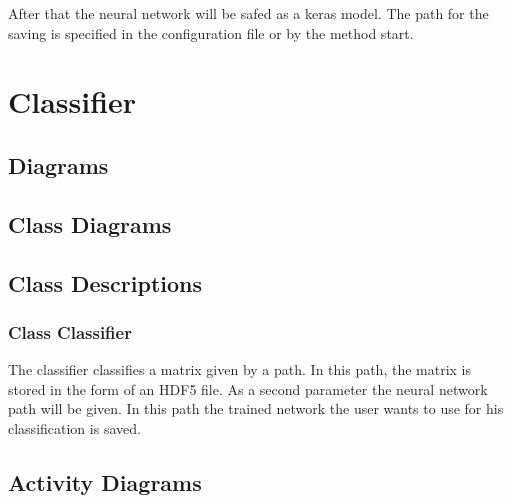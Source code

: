 \documentclass[parskip=full]{scrartcl}
\begin{document}
After that the \gls{neural network} will be safed as a keras model.
The path for the saving is specified in the configuration file or by the method start.


\newpage
\section{Classifier}

\subsection{Diagrams}

\subsection{Class Diagrams}

\begin{figure}[h]
\begin{center}

\label{Class Diagram}
\end{center}
\end{figure}

\newpage


\subsection{Class Descriptions}

\subsubsection{Class Classifier}
The classifier classifies a matrix given by a path. 
In this path, the matrix is stored in the form of an \gls{HDF5} file.
As a second parameter the \gls{neural network} path will be given. 
In this path the trained network the user wants to use for his classification is saved.

\newpage
 
\subsection{Activity Diagrams}
\end{document}
